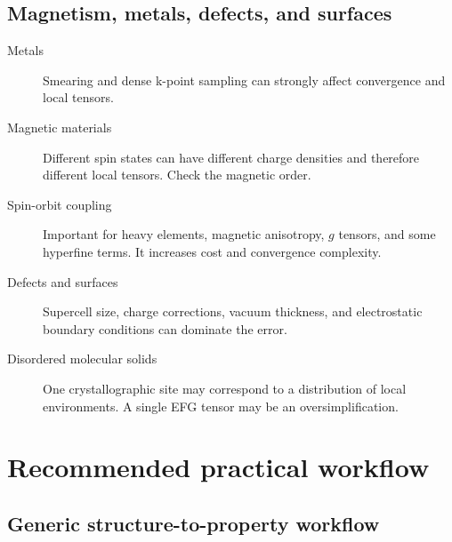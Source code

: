 \documentclass[11pt]{article}
\begin{document}
\subsection{Magnetism, metals, defects, and surfaces}

\begin{description}
\item[Metals] Smearing and dense k-point sampling can strongly affect convergence and local tensors.
\item[Magnetic materials] Different spin states can have different charge densities and therefore different local tensors.  Check the magnetic order.
\item[Spin-orbit coupling] Important for heavy elements, magnetic anisotropy, $g$ tensors, and some hyperfine terms.  It increases cost and convergence complexity.
\item[Defects and surfaces] Supercell size, charge corrections, vacuum thickness, and electrostatic boundary conditions can dominate the error.
\item[Disordered molecular solids] One crystallographic site may correspond to a distribution of local environments.  A single EFG tensor may be an oversimplification.
\end{description}

\section{Recommended practical workflow}

\subsection{Generic structure-to-property workflow}
\end{document}
